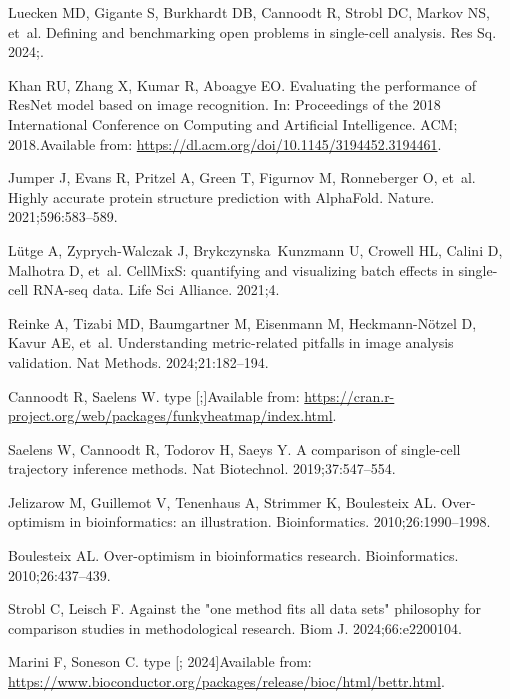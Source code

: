 \documentclass[11pt]{article}
\begin{document}
\begin{thebibliography}{10}
Luecken MD, Gigante S, Burkhardt DB, Cannoodt R, Strobl DC, Markov NS, et~al.
\newblock Defining and benchmarking open problems in single-cell analysis.
\newblock Res Sq. 2024;.

Khan RU, Zhang X, Kumar R, Aboagye EO.
\newblock Evaluating the performance of {ResNet} model based on image
  recognition.
\newblock In: Proceedings of the 2018 International Conference on Computing and
  Artificial Intelligence. ACM; 2018.Available from:
  \url{https://dl.acm.org/doi/10.1145/3194452.3194461}.

Jumper J, Evans R, Pritzel A, Green T, Figurnov M, Ronneberger O, et~al.
\newblock Highly accurate protein structure prediction with AlphaFold.
\newblock Nature. 2021;596:583--589.

Lütge A, Zyprych-Walczak J, Brykczynska~Kunzmann U, Crowell HL, Calini D,
  Malhotra D, et~al.
\newblock CellMixS: quantifying and visualizing batch effects in single-cell
  RNA-seq data.
\newblock Life Sci Alliance. 2021;4.

Reinke A, Tizabi MD, Baumgartner M, Eisenmann M, Heckmann-Nötzel D, Kavur AE,
  et~al.
\newblock Understanding metric-related pitfalls in image analysis validation.
\newblock Nat Methods. 2024;21:182--194.

Cannoodt R, Saelens W. type [;]Available from:
  \url{https://cran.r-project.org/web/packages/funkyheatmap/index.html}.

Saelens W, Cannoodt R, Todorov H, Saeys Y.
\newblock A comparison of single-cell trajectory inference methods.
\newblock Nat Biotechnol. 2019;37:547--554.

Jelizarow M, Guillemot V, Tenenhaus A, Strimmer K, Boulesteix AL.
\newblock Over-optimism in bioinformatics: an illustration.
\newblock Bioinformatics. 2010;26:1990--1998.

Boulesteix AL.
\newblock Over-optimism in bioinformatics research.
\newblock Bioinformatics. 2010;26:437--439.

Strobl C, Leisch F.
\newblock Against the "one method fits all data sets" philosophy for comparison
  studies in methodological research.
\newblock Biom J. 2024;66:e2200104.

Marini F, Soneson C. type [; 2024]Available from:
  \url{https://www.bioconductor.org/packages/release/bioc/html/bettr.html}.


\end{thebibliography}
\end{document}
